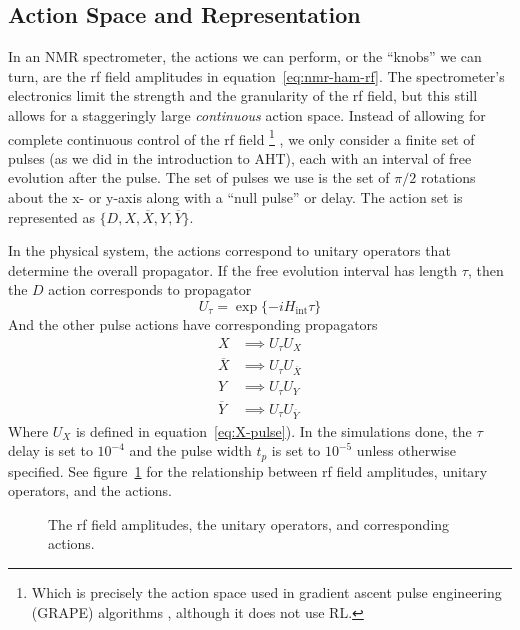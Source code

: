 \subsection{Action Space and Representation}

In an NMR spectrometer, the actions we can perform, or the ``knobs'' we can turn, are the rf field amplitudes in equation~\ref{eq:nmr-ham-rf}.
The spectrometer's electronics limit the strength and the granularity of the rf field,
but this still allows for a staggeringly large \emph{continuous} action space. Instead of allowing for complete continuous control of the rf field%
\footnote{
Which is precisely the action space used in gradient ascent pulse engineering (GRAPE) algorithms \cite{Khaneja-2005}, although it does not use RL.
}
, we only consider a finite set of pulses (as we did in the introduction to AHT), each with an interval of free evolution after the pulse. The set of pulses we use is the set of $\pi/2$ rotations about the x- or y-axis along with a ``null pulse'' or delay. The action set is represented as $\{ D, X, \overline{X}, Y, \overline{Y} \}$.



In the physical system, the actions correspond to unitary operators that determine the overall propagator. If the free evolution interval has length $\tau$, then the $D$ action corresponds to propagator
\[
U_{\tau} = \exp\{ -i H_{\text{int}} \tau \}
\]
And the other pulse actions have corresponding propagators
\begin{align*}
    X &\implies U_{\tau} U_X \\
    \overline{X} &\implies U_{\tau} U_{\overline{X}} \\
    Y & \implies U_{\tau} U_Y \\
    \overline{Y} &\implies U_{\tau} U_{\overline{Y}}
\end{align*}
Where $U_X$ is defined in equation~\ref{eq:X-pulse}). In the simulations done, the $\tau$ delay is set to $10^{-4}$ and the pulse width $t_p$ is set to $10^{-5}$ unless otherwise specified.
See figure~\ref{fig:actions} for the relationship between rf field amplitudes, unitary operators, and the actions.

\begin{figure}[H]
    \centering
    
    \caption{The rf field amplitudes, the unitary operators, and corresponding actions.}
    \label{fig:actions}
\end{figure}

